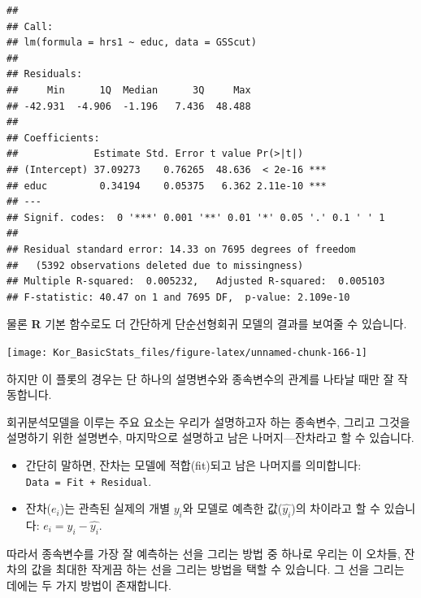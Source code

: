 \documentclass[]{book}
\newenvironment{Shaded}{\begin{snugshade}}{\end{snugshade}}
\newcommand{\DataTypeTok}[1]{\textcolor[rgb]{0.13,0.29,0.53}{#1}}
\newcommand{\KeywordTok}[1]{\textcolor[rgb]{0.13,0.29,0.53}{\textbf{#1}}}
\newcommand{\NormalTok}[1]{#1}
\newcommand{\OperatorTok}[1]{\textcolor[rgb]{0.81,0.36,0.00}{\textbf{#1}}}
\begin{document}
\begin{verbatim}
## 
## Call:
## lm(formula = hrs1 ~ educ, data = GSScut)
## 
## Residuals:
##     Min      1Q  Median      3Q     Max 
## -42.931  -4.906  -1.196   7.436  48.488 
## 
## Coefficients:
##             Estimate Std. Error t value Pr(>|t|)    
## (Intercept) 37.09273    0.76265  48.636  < 2e-16 ***
## educ         0.34194    0.05375   6.362 2.11e-10 ***
## ---
## Signif. codes:  0 '***' 0.001 '**' 0.01 '*' 0.05 '.' 0.1 ' ' 1
## 
## Residual standard error: 14.33 on 7695 degrees of freedom
##   (5392 observations deleted due to missingness)
## Multiple R-squared:  0.005232,   Adjusted R-squared:  0.005103 
## F-statistic: 40.47 on 1 and 7695 DF,  p-value: 2.109e-10
\end{verbatim}

물론 \textbf{R} 기본 함수로도 더 간단하게 단순선형회귀 모델의 결과를 보여줄 수 있습니다.

\begin{Shaded}
\end{Shaded}

\begin{center}\texttt{[image: Kor\_BasicStats\_files/figure-latex/unnamed-chunk-166-1]} \end{center}

하지만 이 플롯의 경우는 단 하나의 설명변수와 종속변수의 관계를 나타날 때만 잘 작동합니다.

회귀분석모델을 이루는 주요 요소는 우리가 설명하고자 하는 종속변수, 그리고 그것을 설명하기 위한 설명변수, 마지막으로 설명하고 남은 나머지---잔차라고 할 수 있습니다.

\begin{itemize}
\item
  간단히 말하면, 잔차는 모델에 적합(fit)되고 남은 나머지를 의미합니다: \texttt{Data\ =\ Fit\ +\ Residual}.
\item
  잔차(\(e_i\))는 관측된 실제의 개별 \(y_i\)와 모델로 예측한 값(\(\hat{y_i}\))의 차이라고 할 수 있습니다: \(e_i = y_i - \hat{y_i}\).
\end{itemize}

따라서 종속변수를 가장 잘 예측하는 선을 그리는 방법 중 하나로 우리는 이 오차들, 잔차의 값을 최대한 작게끔 하는 선을 그리는 방법을 택할 수 있습니다. 그 선을 그리는 데에는 두 가지 방법이 존재합니다.
\end{document}

